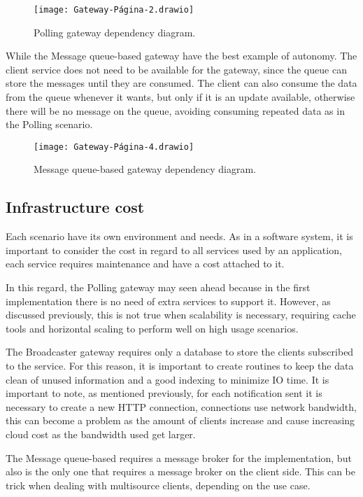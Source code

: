 \begin{figure}
    \centering
    \texttt{[image: Gateway-Página-2.drawio]}
    \caption{Polling gateway dependency diagram.\label{fig:subfigures}}
\end{figure}

While the Message queue-based gateway have the best example of autonomy. The client service does not need to be available for the gateway, since the queue can store the messages until they are consumed. The client can also consume the data from the queue whenever it wants, but only if it is an update available, otherwise there will be no message on the queue, avoiding consuming repeated data as in the Polling scenario.

\begin{figure}
    \centering
    \texttt{[image: Gateway-Página-4.drawio]}
    \caption{Message queue-based gateway dependency diagram.\label{fig:subfigures}}
\end{figure}

\subsection*{Infrastructure cost}
\label{sec:infra}

Each scenario have its own environment and needs. As in a software system, it is important to consider the cost in regard to all services used by an application, each service requires maintenance and have a cost attached to it.

In this regard, the Polling gateway may seen ahead because in the first implementation there is no need of extra services to support it. However, as discussed previously, this is not true when scalability is necessary, requiring cache tools and horizontal scaling to perform well on high usage scenarios.

The Broadcaster gateway requires only a database to store the clients subscribed to the service. For this reason, it is important to create routines to keep the data clean of unused information and a good indexing to minimize IO time. It is important to note, as mentioned previously, for each notification sent it is necessary to create a new HTTP connection, connections use network bandwidth, this can become a problem as the amount of clients increase and cause increasing cloud cost as the bandwidth used get larger.

The Message queue-based requires a message broker for the implementation, but also is the only one that requires a message broker on the client side. This can be trick when dealing with multisource clients, depending on the use case.
